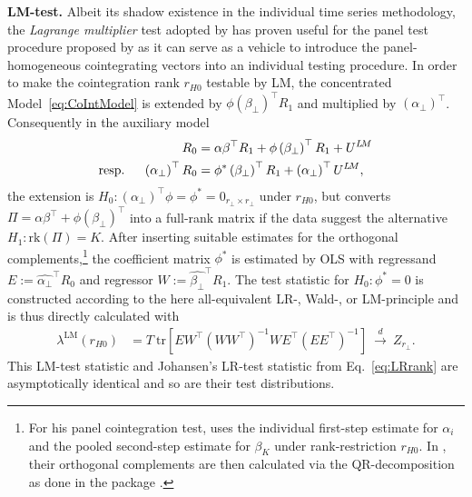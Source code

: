\textbf{LM-test.} Albeit its shadow existence in the individual time series methodology, the \textit{Lagrange multiplier} test adopted by \cite{LuukkonenEtAl1999} has proven useful for the panel test procedure proposed by \cite{Breitung2005} as it can serve as a vehicle to introduce the panel-homogeneous cointegrating vectors into an individual testing procedure. In order to make the cointegration rank $ r_{H0} $ testable by LM, the concentrated Model~\eqref{eq:CoIntModel} is extended by $ \phi \left( \beta_\perp \right)^\top R_{1} $ and multiplied by $ \left( \alpha_\perp \right)^\top $. Consequently in the auxiliary model
\begin{align} \label{eq:auxLMrank}
\begin{split}
	R_{0} & = \alpha \beta^\top R_{1} + \phi \left( \beta_\perp \right)^\top R_{1} + U^{{L \! M}} \\
	\text{resp. \quad} \left( \alpha_\perp \right)^\top R_{0} & = \phi^* \left( \beta_\perp \right)^\top R_{1} + \left( \alpha_\perp \right)^\top U^{{L \! M}},
\end{split}
\end{align}
the extension is $ H_0: \left( \alpha_\perp \right)^\top \phi = \phi^* = 0_{r_\perp \times r_\perp} $ under $ r_{H0} $, but converts $ \Pi = \alpha \beta^\top + \phi \left( \beta_\perp \right)^\top $ into a full-rank matrix if the data suggest the alternative $ H_1: \text{rk}(\Pi) = K $. After inserting suitable estimates for the orthogonal complements,\footnote{For his panel cointegration test, \citet{Breitung2005} uses the individual first-step estimate for $ \alpha_i $ and the pooled second-step estimate for $ \beta_K $ under rank-restriction $ r_{H0} $. In , their orthogonal complements are then calculated via the QR-decomposition as done in the  package \citep{VenablesRipley2002}.} the coefficient matrix $ \phi^* $ is estimated by OLS with regressand $ E := \widehat{\alpha_\perp}^\top R_0 $ and regressor $ W := \widehat{\beta_\perp}^\top R_1 $. The test statistic for $ H_0: \phi^* = 0 $ is constructed according to the here all-equivalent LR-, Wald-, or LM-principle and is thus directly calculated with
\begin{align} \label{eq:LMrank}
	\lambda^{\text{LM}} \left( r_{H0} \right) & = T \ \text{tr} \left[ EW^\top \left( WW^\top \right)^{-1} WE^\top \left( EE^\top \right)^{-1} \right] \ \overset{d}{\longrightarrow} \ Z_{r_\perp}.
\end{align}
This LM-test statistic and Johansen's LR-test statistic from Eq.~\eqref{eq:LRrank} are asymptotically identical and so are their test distributions.


